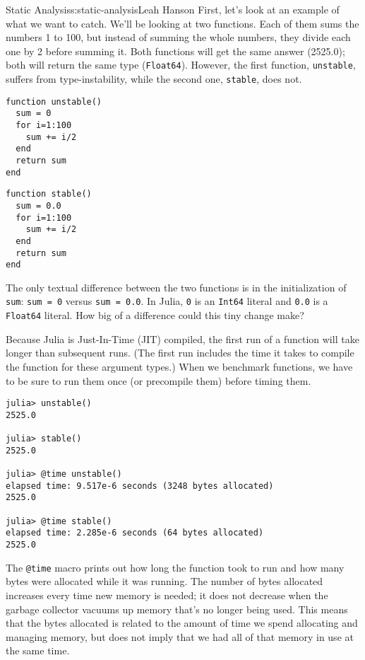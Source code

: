 \begin{aosachapter}{Static Analysis}{s:static-analysis}{Leah Hanson}
First, let's look at an example of what we want to catch. We'll be
looking at two functions. Each of them sums the numbers 1 to 100, but
instead of summing the whole numbers, they divide each one by 2 before
summing it. Both functions will get the same answer (2525.0); both will
return the same type (\texttt{Float64}). However, the first function,
\texttt{unstable}, suffers from type-instability, while the second one,
\texttt{stable}, does not.

\begin{verbatim}
function unstable()
  sum = 0
  for i=1:100
    sum += i/2
  end
  return sum
end
\end{verbatim}

\begin{verbatim}
function stable()
  sum = 0.0
  for i=1:100
    sum += i/2
  end
  return sum
end
\end{verbatim}

The only textual difference between the two functions is in the
initialization of \texttt{sum}: \texttt{sum = 0} versus
\texttt{sum = 0.0}. In Julia, \texttt{0} is an \texttt{Int64} literal
and \texttt{0.0} is a \texttt{Float64} literal. How big of a difference
could this tiny change make?

Because Julia is Just-In-Time (JIT) compiled, the first run of a
function will take longer than subsequent runs. (The first run includes
the time it takes to compile the function for these argument types.)
When we benchmark functions, we have to be sure to run them once (or
precompile them) before timing them.

\begin{verbatim}
julia> unstable()
2525.0

julia> stable()
2525.0

julia> @time unstable()
elapsed time: 9.517e-6 seconds (3248 bytes allocated)
2525.0

julia> @time stable()
elapsed time: 2.285e-6 seconds (64 bytes allocated)
2525.0
\end{verbatim}

The \texttt{@time} macro prints out how long the function took to run
and how many bytes were allocated while it was running. The number of
bytes allocated increases every time new memory is needed; it does not
decrease when the garbage collector vacuums up memory that's no longer
being used. This means that the bytes allocated is related to the amount
of time we spend allocating and managing memory, but does not imply that
we had all of that memory in use at the same time.


\end{aosachapter}
